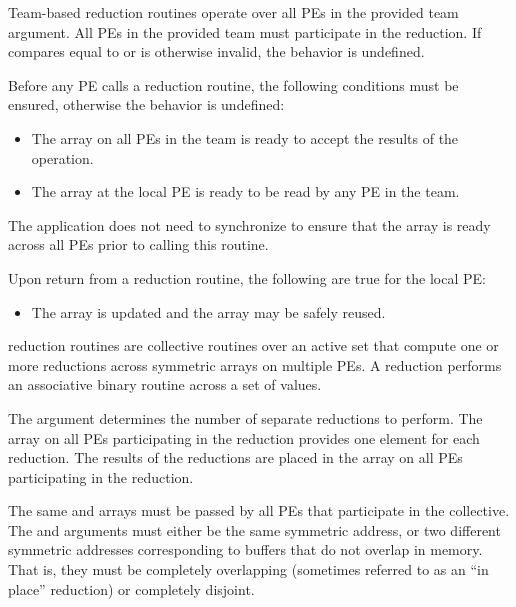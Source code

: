 \begin{apidefinition}
{    Team-based reduction routines operate over all \acp{PE} in the provided team argument. All
    \acp{PE} in the provided team must participate in the reduction.
    If  compares equal to  or is
    otherwise invalid, the behavior is undefined.

    Before any \ac{PE} calls a reduction routine, the following conditions
    must be ensured, otherwise the behavior is undefined:
    \begin{itemize}
        \item The \dest{} array on all \acp{PE} in the team is ready to
            accept the results of the operation.
        \item The \source{} array at the local \ac{PE} is ready to be read by
            any \ac{PE} in the team.
    \end{itemize}
    The application does not need to synchronize to ensure that the \source{}
    array is ready across all \acp{PE} prior to calling this routine.
    
    Upon return from a reduction routine, the following are true for the local
    \ac{PE}:
    \begin{itemize}
    \item The \dest{} array is updated and the \source{} array may be safely reused.
    \end{itemize}

\begin{DeprecateBlock}
    \openshmem reduction routines are collective routines over an active set 
	that compute one or more reductions across symmetric
    arrays on multiple \acp{PE}.  A reduction performs an associative binary routine
    across a set of values.

    The  argument determines the number of separate reductions to
    perform.  The \source{} array on all \acp{PE} participating in the reduction
    provides one element for each reduction.  The results of the reductions are placed in the
    \dest{} array on all \acp{PE} participating in the reduction.

    The same \source{} and \dest{} arrays must be passed by all PEs that
    participate in the collective.
    The \source{} and \dest{} arguments must either be the same symmetric
    address, or two different symmetric addresses corresponding to buffers that
    do not overlap in memory. That is, they must be completely overlapping (sometimes referred to as an ``in place'' reduction) or
    completely disjoint.


\end{DeprecateBlock}}
\end{apidefinition}
